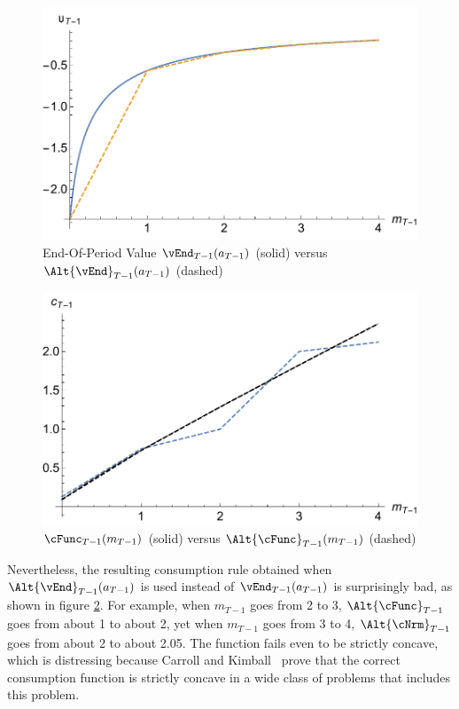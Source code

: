 \documentclass[titlepage, headings=optiontotocandhead]{\econtex}
\begin{document}
\hypertarget{PlotOTm1RawVSInt}{}
\begin{figure}
  \includegraphics{./Figures/PlotOTm1RawVSInt}
  \caption{End-Of-Period Value $\vEnd_{T-1}({a}_{T-1})$ (solid) versus $\Alt{\vEnd}_{T-1}({a}_{T-1})$ (dashed)}
  \label{fig:PlotOTm1RawVSInt}
\end{figure}

\hypertarget{PlotComparecTm1AB}{}
\begin{figure}
  \includegraphics{./Figures/PlotComparecTm1AB}
  \caption{$\cFunc_{T-1}({m}_{T-1})$ (solid) versus $\Alt{\cFunc}_{T-1}({m}_{T-1})$ (dashed)}
  \label{fig:PlotComparecTm1AB}
\end{figure}

Nevertheless, the resulting consumption rule obtained when $\Alt{\vEnd}_{T-1}({a}_{T-1})$
is used
instead of $\vEnd_{T-1}({a}_{T-1})$ is surprisingly bad, as
shown in figure \ref{fig:PlotComparecTm1AB}.  For example, when
${m}_{T-1}$ goes from 2 to 3, $\Alt{\cFunc}_{T-1}$ goes from about 1
to about 2, yet when ${m}_{T-1}$ goes from 3 to 4, $\Alt{\cNrm}_{T-1}$
goes from about 2 to about 2.05.  The function fails even to be
strictly concave, which is distressing because Carroll and
Kimball~\citeyearpar{carroll&kimball:concavity} prove that the correct
consumption function is strictly concave in a wide class of problems that
includes this problem.
\end{document}
